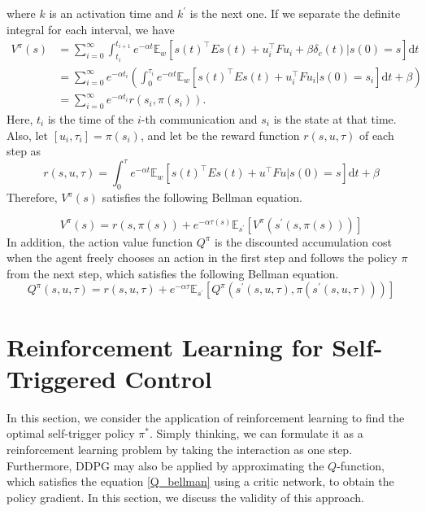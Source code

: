 \documentclass[english, dvipdfmx]{ampmt}             %
\newcommand{\expect}{\mathbb{E}}
\begin{document}
where $k$ is an activation time and $k^{\prime}$ is the next one. If we separate the definite integral for each interval, we have 
\begin{align}
	V^{\pi}(s) &= \sum_{i=0}^{\infty}\int_{t_i}^{t_{i+1}} e^{-\alpha t}\expect_{w}[s(t)^{\top}Es(t)+u_i^{\top}Fu_i+\beta \delta_c(t)|s(0)=s]\textrm{d}t \nonumber \\
			 &= \sum_{i=0}^{\infty} e^{-\alpha t_i} \left(\int_{0}^{\tau_i}e^{-\alpha t}\expect_{w}[s(t)^{\top}Es(t)+u_i^{\top}Fu_i|s(0)=s_i]\textrm{d}t + \beta\right) \nonumber \\
			 &= \sum_{i=0}^{\infty} e^{-\alpha t_i} r(s_i, \pi(s_i)) \label{self_acc_reward}.
\end{align}
Here, $t_i$ is the time of the $i$-th communication and $s_i$ is the state at that time. Also, let $[u_i, \tau_i]=\pi(s_i)$, and let be the reward function $r(s, u, \tau)$ of each step as
\begin{equation}
	r(s, u, \tau) = \int_{0}^{\tau}e^{-\alpha t}\expect_{w}[s(t)^{\top}Es(t)+u^{\top}Fu|s(0)=s]\textrm{d}t + \beta
\end{equation}
Therefore, $V^{\pi}(s)$ satisfies the following Bellman equation. \par
\begin{equation}
	V^{\pi}(s) = r(s,\pi(s)) + e^{-\alpha\tau(s)}\expect_{s^{\prime}}[V^{\pi}(s^{\prime}(s,\pi(s)))] \label{bellman}
\end{equation}
In addition, the action value function $Q^{\pi}$ is the discounted accumulation cost when the agent freely chooses an action in the first step and follows the policy $\pi$ from the next step, which satisfies the following Bellman equation.
\begin{equation}
	Q^{\pi}(s,u,\tau) = r(s,u,\tau) + e^{-\alpha\tau}\expect_{s^{\prime}}[Q^{\pi}(s^{\prime}(s,u,\tau), \pi(s^{\prime}(s,u,\tau)))] \label{Q_bellman}
\end{equation}

\section{Reinforcement Learning for Self-Triggered Control}
In this section, we consider the application of reinforcement learning to find the optimal self-trigger policy $\pi^{*}$. Simply thinking, we can formulate it as a reinforcement learning problem by taking the interaction as one step. Furthermore, DDPG may also be applied by approximating the $Q$-function, which satisfies the equation \eqref{Q_bellman} using a critic network, to obtain the policy gradient. In this section, we discuss the validity of this approach.
\end{document}
